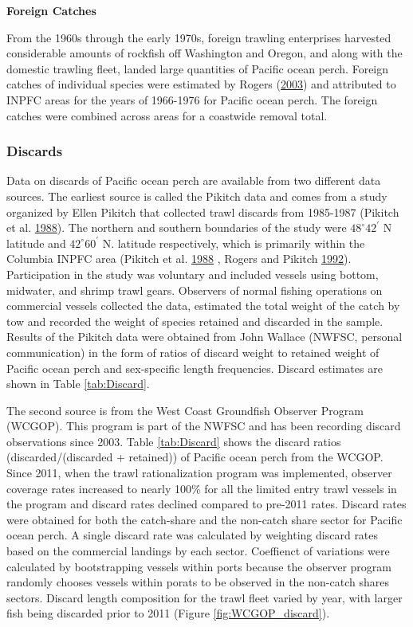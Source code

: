 \documentclass[12pt,]{article}
\begin{document}
\textbf{Foreign Catches}

From the 1960s through the early 1970s, foreign trawling enterprises
harvested considerable amounts of rockfish off Washington and Oregon,
and along with the domestic trawling fleet, landed large quantities of
Pacific ocean perch. Foreign catches of individual species were
estimated by Rogers (\protect\hyperlink{ref-rogers_species_2003}{2003})
and attributed to INPFC areas for the years of 1966-1976 for Pacific
ocean perch. The foreign catches were combined across areas for a
coastwide removal total.

\subsubsection{Discards}\label{discards}

Data on discards of Pacific ocean perch are available from two different
data sources. The earliest source is called the Pikitch data and comes
from a study organized by Ellen Pikitch that collected trawl discards
from 1985-1987 (Pikitch et al.
\protect\hyperlink{ref-pikitch_evaluation_1988}{1988}). The northern and
southern boundaries of the study were \(48^\circ 42^\prime\) N latitude
and \(42^\circ 60^\prime\) N. latitude respectively, which is primarily
within the Columbia INPFC area (Pikitch et al.
\protect\hyperlink{ref-pikitch_evaluation_1988}{1988} , Rogers and
Pikitch \protect\hyperlink{ref-rogers_numerical_1992}{1992}).
Participation in the study was voluntary and included vessels using
bottom, midwater, and shrimp trawl gears. Observers of normal fishing
operations on commercial vessels collected the data, estimated the total
weight of the catch by tow and recorded the weight of species retained
and discarded in the sample. Results of the Pikitch data were obtained
from John Wallace (NWFSC, personal communication) in the form of ratios
of discard weight to retained weight of Pacific ocean perch and
sex-specific length frequencies. Discard estimates are shown in Table
\ref{tab:Discard}.

The second source is from the West Coast Groundfish Observer Program
(WCGOP). This program is part of the NWFSC and has been recording
discard observations since 2003. Table \ref{tab:Discard} shows the
discard ratios (discarded/(discarded + retained)) of Pacific ocean perch
from the WCGOP. Since 2011, when the trawl rationalization program was
implemented, observer coverage rates increased to nearly 100\% for all
the limited entry trawl vessels in the program and discard rates
declined compared to pre-2011 rates. Discard rates were obtained for
both the catch-share and the non-catch share sector for Pacific ocean
perch. A single discard rate was calculated by weighting discard rates
based on the commercial landings by each sector. Coeffienct of
variations were calculated by bootstrapping vessels within ports because
the observer program randomly chooses vessels within porats to be
observed in the non-catch shares sectors. Discard length composition for
the trawl fleet varied by year, with larger fish being discarded prior
to 2011 (Figure \ref{fig:WCGOP_discard}).
\end{document}
